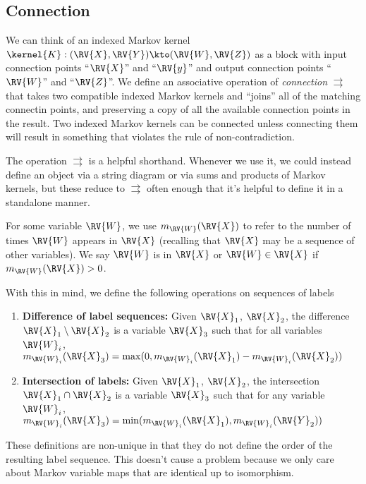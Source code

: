 \subsection{Connection}

We can think of an indexed Markov kernel $\kernel{K}:(\RV{X},\RV{Y})\kto (\RV{W},\RV{Z})$ as a block with input connection points ``$\RV{X}$'' and ``$\RV{y}$'' and output connection points ``$\RV{W}$'' and ``$\RV{Z}$''. We define an associative operation of \emph{connection} $\rightrightarrows$ that takes two compatible indexed Markov kernels and ``joins'' all of the matching connectin points, and preserving a copy of all the available connection points in the result. Two indexed Markov kernels can be connected unless connecting them will result in something that violates the rule of non-contradiction.

The operation $\rightrightarrows$ is a helpful shorthand. Whenever we use it, we could instead define an object via a string diagram or via sums and products of Markov kernels, but these reduce to $\rightrightarrows$ often enough that it's helpful to define it in a standalone manner.


For some variable $\RV{W}$, we use $m_{\RV{W}}(\RV{X})$ to refer to the number of times $\RV{W}$ appears in $\RV{X}$ (recalling that $\RV{X}$ may be a sequence of other variables). We say $\RV{W}$ is in $\RV{X}$ or $\RV{W}\in \RV{X}$ if $m_{\RV{W}}(\RV{X})>0$.

With this in mind, we define the following operations on sequences of labels

\begin{enumerate}
    \item \textbf{Difference of label sequences:} Given $\RV{X}_1$, $\RV{X}_2$, the difference $\RV{X}_1\setminus \RV{X}_2$ is a variable $\RV{X}_3$ such that for all variables $\RV{W}_i$, $m_{\RV{W}_i}(\RV{X}_3) = \max(0,m_{\RV{W}_i}(\RV{X}_1)-m_{\RV{W}_i}(\RV{X}_2))$
    \item \textbf{Intersection of labels:} Given $\RV{X}_1$, $\RV{X}_2$, the intersection $\RV{X}_1\cap \RV{X}_2$ is a variable $\RV{X}_3$ such that for any variable $\RV{W}_i$, $m_{\RV{W}_i}(\RV{X}_3) = \min(m_{\RV{W}_i}(\RV{X}_1),m_{\RV{W}_i}(\RV{Y}_2))$
\end{enumerate}

These definitions are non-unique in that they do not define the order of the resulting label sequence. This doesn't cause a problem because we only care about Markov variable maps that are identical up to isomorphism.

